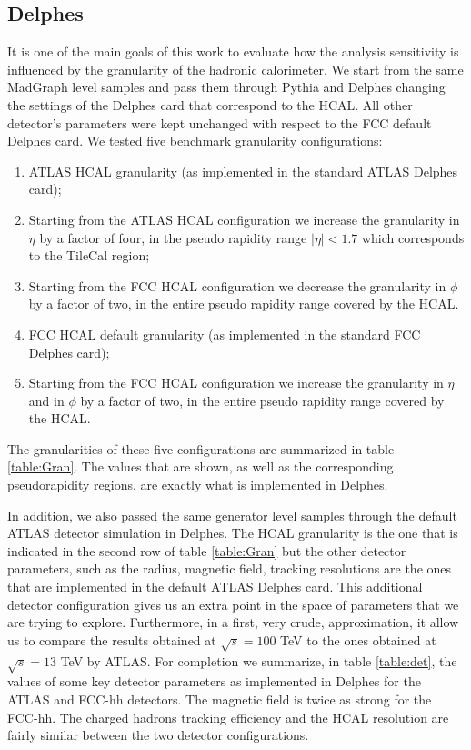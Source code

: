 \subsection{Delphes}
\label{sec:HCALgran}

It is one of the main goals of this work to evaluate how the analysis sensitivity is influenced by the granularity of the hadronic calorimeter. We start from the same MadGraph level samples and pass them through Pythia and Delphes changing the settings of the Delphes card that correspond to the HCAL. All other detector's parameters were kept unchanged with respect to the FCC default Delphes card. 
We tested five benchmark granularity configurations:

\begin{enumerate}
	\item ATLAS HCAL granularity (as implemented in the standard ATLAS Delphes card);
	\item Starting from the ATLAS HCAL configuration we increase the granularity in $\eta$ by a factor of four, in the pseudo rapidity range $|\eta|<1.7$ which corresponds to the TileCal region;
	\item Starting from the FCC HCAL configuration we decrease the granularity in $\phi$ by a factor of two, in the entire pseudo rapidity range covered by the HCAL.
	\item FCC HCAL default granularity (as implemented in the standard FCC Delphes card);
	\item Starting from the FCC HCAL configuration we increase the granularity in $\eta$ and in $\phi$ by a factor of two, in the entire pseudo rapidity range covered by the HCAL.
\end{enumerate}

The granularities of these five configurations are summarized in table \ref{table:Gran}. The values that are shown, as well as the corresponding pseudorapidity regions, are exactly what is implemented in Delphes. 

In addition, we also passed the same generator level samples through the default ATLAS detector simulation in Delphes. The HCAL granularity is the one that is indicated in the second row of table \ref{table:Gran} but the other detector parameters, such as the radius, magnetic field, tracking resolutions are the ones that are implemented in the default ATLAS Delphes card. This additional detector configuration gives us an extra point in the space of parameters that we are trying to explore. Furthermore, in a first, very crude, approximation, it allow us to compare the results obtained at $\sqrt{s}=100$ TeV to the ones obtained at $\sqrt{s}=13$ TeV by ATLAS.
For completion we summarize, in table \ref{table:det}, the values of some key detector parameters as implemented in Delphes for the ATLAS and FCC-hh detectors. The magnetic field is twice as strong for the FCC-hh. The charged hadrons tracking efficiency and the HCAL resolution are fairly similar between the two detector configurations.

